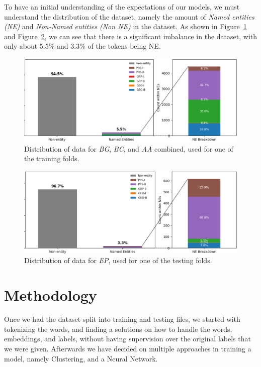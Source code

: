 \documentclass[11pt]{article}
\begin{document}
To have an initial understanding of the expectations of our models, we must understand the distribution of the dataset, namely the amount of
\textit{Named entities (NE)} and \textit{Non-Named entities (Non NE)} in the dataset. As shown in Figure~\ref{fig:NER-Train} and Figure~\ref{fig:NER-Test}, 
we can see that there is a significant imbalance in the dataset, with only about 5.5\% and 3.3\% of the tokens being NE.

\begin{figure}[H]
  \includegraphics[width=\columnwidth]{NER-Train.png}
  \caption{Distribution of data for \textit{BG}, \textit{BC}, and \textit{AA} combined, used for one of the training folds.}
  \label{fig:NER-Train}
\end{figure}

\begin{figure}[H]
  \includegraphics[width=\columnwidth]{NER-Test.png}
  \caption{Distribution of data for \textit{EP}, used for one of the testing folds.}
  \label{fig:NER-Test}
\end{figure}

\section{Methodology}

Once we had the dataset split into training and testing files, we started with tokenizing the words, and finding a solutions on how to
handle the words, embeddings, and labels, without having supervision over the original labels that we were given. Afterwards we have decided on
multiple approaches in training a model, namely Clustering, and a Neural Network.
\end{document}
